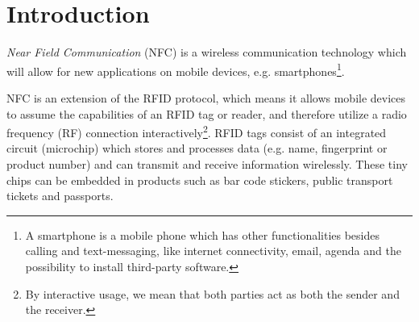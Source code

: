 \section{Introduction}


\textit{Near Field Communication} (NFC) is a wireless communication technology which will allow for new applications on mobile devices, e.g. smartphones\footnote{A smartphone is a mobile phone which has other functionalities besides calling and text-messaging, like internet connectivity, email, agenda and the possibility to install third-party software.}.


 
NFC is an extension of the RFID protocol, which means it allows mobile devices to assume the capabilities of an RFID tag or reader, and therefore utilize a radio frequency (RF) connection interactively\footnote{By interactive usage, we mean that both parties act as both the sender and the receiver.}.
RFID tags consist of an integrated circuit (microchip) which stores and processes data (e.g. name, fingerprint or product number) and can transmit and receive information wirelessly. %
These tiny chips can be embedded in products such as bar code stickers, public transport tickets and passports.

